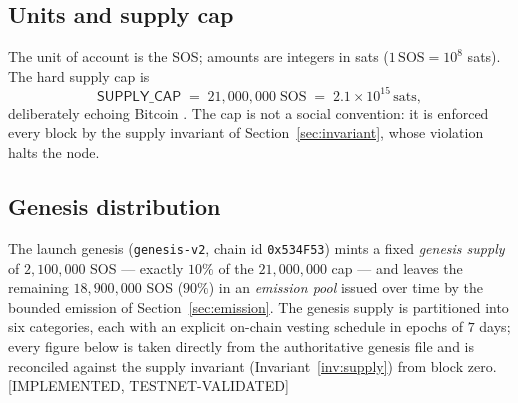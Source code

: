 \documentclass[11pt]{article}
\newcommand{\code}[1]{\texttt{#1}}
\newcommand{\statusV}{\textcolor{statgreen}{\textsf{\scriptsize[IMPLEMENTED, TESTNET-VALIDATED]}}}
\theoremstyle{plain}
\theoremstyle{definition}
\theoremstyle{remark}
\begin{document}
\subsection{Units and supply cap}

The unit of account is the SOS; amounts are integers in sats
($1\,\mathrm{SOS} = 10^8$ sats). The hard supply cap is
\[
\textsf{SUPPLY\_CAP} \;=\; 21{,}000{,}000 \;\mathrm{SOS}
\;=\; 2.1 \times 10^{15} \,\text{sats},
\]
deliberately echoing Bitcoin \cite{nakamoto2008}. The cap is not a social
convention: it is enforced every block by the supply invariant of
Section~\ref{sec:invariant}, whose violation halts the node.

\subsection{Genesis distribution}
\label{sec:claim}

The launch genesis (\code{genesis-v2}, chain id \code{0x534F53}) mints a fixed
\emph{genesis supply} of $2{,}100{,}000$ SOS --- exactly $10\%$ of the
$21{,}000{,}000$ cap --- and leaves the remaining $18{,}900{,}000$ SOS ($90\%$)
in an \emph{emission pool} issued over time by the bounded emission of
Section~\ref{sec:emission}. The genesis supply is partitioned into six
categories, each with an explicit on-chain vesting schedule in epochs of
$7$ days; every figure below is taken directly from the authoritative genesis
file and is reconciled against the supply invariant
(Invariant~\ref{inv:supply}) from block zero. \statusV{}

\begin{center}
\end{center}
\end{document}
